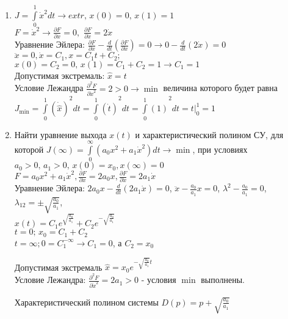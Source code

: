 \documentclass[preprint,russian,a5paper,10pt,twoside]{ncc}
\begin{document}
\begin{enumerate}
\item $J=\int\limits_{0}^{1}{{{{\dot{x}}}^{2}}dt\to extr,\,x\left( 0 \right)}=0,\,x\left( 1 \right)=1$
\\$F={{\dot{x}}^{2}}\to \frac{\partial F}{\partial x}=0,\,\,\frac{\partial F}{\partial \dot{x}}=2\dot{x}$
\\Уравнение Эйлера: $\frac{\partial F}{\partial x}-\frac{d}{dt}\left( \frac{\partial F}{\partial \dot{x}} \right)=0\to 0-\frac{d}{dt}\left( 2\dot{x} \right)=0$
\\$\ddot{x}=0,\dot{x}={{C}_{1}},x={{C}_{1}}t+{{C}_{2}};$
\\$x\left( 0 \right)={{C}_{2}}=0,\,x\left( 1 \right)={{C}_{1}}+{{C}_{2}}=1\to {{C}_{1}}=1$
\\Допустимая экстремаль: $\hat{x}=t$
\\Условие Лежандра $\frac{{{\partial }^{2}}F}{\partial {{{\dot{x}}}^{2}}}=2>0\to \min $ величина которого будет равна ${{J}_{\min }}={{\int\limits_{0}^{1}{\left( {\dot{\hat{x}}} \right)}}^{2}}dt={{\int\limits_{0}^{1}{\left( {\dot{t}} \right)}}^{2}}dt={{\int\limits_{0}^{1}{\left( 1 \right)}}^{2}}dt=\left. t \right|_{0}^{1}=1$
\item Найти уравнение выхода $x\left( t \right)$  и характеристический полином СУ, для которой $J\left( \infty  \right)=\int\limits_{0}^{\infty }{\left( {{a}_{0}}{{x}^{2}}+{{a}_{1}}{{{\dot{x}}}^{2}} \right)}dt\to \min$, при условиях ${{a}_{0}}>0,\,{{a}_{1}}>0,\,x\left( 0 \right)={{x}_{0}},x\left( \infty  \right)=0$
\\$F={{a}_{0}}{{x}^{2}}+{{a}_{1}}{{\dot{x}}^{2}},\frac{\partial F}{\partial x}=2{{a}_{0}}x,\frac{\partial F}{\partial \dot{x}}=2{{a}_{1}}\dot{x}$
\\Уравнение Эйлера: $2{{a}_{0}}x-\frac{d}{dt}\left( 2{{a}_{1}}\dot{x} \right)=0$, $\ddot{x}-\frac{{{a}_{0}}}{{{a}_{1}}}x=0$, ${{\lambda }^{2}}-\frac{{{a}_{0}}}{{{a}_{1}}}=0$, ${{\lambda }_{12}}=\pm \sqrt{\frac{{{a}_{0}}}{{{a}_{1}}}}$, 
\\$x\left( t \right)={{C}_{1}}{{e}^{\sqrt{\frac{{{a}_{0}}}{{{a}_{1}}}}}}+{{C}_{2}}{{e}^{-\sqrt{\frac{{{a}_{0}}}{{{a}_{1}}}}}}$
\\$t=0;\,{{x}_{0}}={{C}_{1}}+{{C}_{2}}$
\\$t=\infty ;0=C_{1}^{-\infty }\to {{C}_{1}}=0$, а ${{C}_{2}}={{x}_{0}}$
\par Допустимая экстремаль $\hat{x}={{x}_{0}}{{e}^{-\sqrt{\frac{{{a}_{0}}}{{{a}_{1}}}}t}}$
\\Условие Лежандра: $\frac{{{\partial }^{2}}F}{\partial {{{\dot{x}}}^{2}}}=2{{a}_{1}}>0$ - условия $\min $ выполнены.
\par Характеристический полином системы $D\left( p \right)=p+\sqrt{\frac{{{a}_{0}}}{{{a}_{1}}}}$ 
\end{enumerate}
\end{document}
